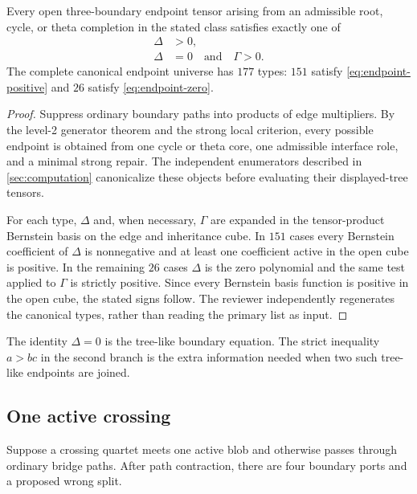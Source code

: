 \begin{lemma}\label{lem:endpoint-dichotomy}
Every open three-boundary endpoint tensor arising from an admissible root, cycle, or theta completion in the stated class satisfies exactly one of
\begin{align}
\Delta&>0,\label{eq:endpoint-positive}\\
\Delta&=0\quad\text{and}\quad \Gamma>0.\label{eq:endpoint-zero}
\end{align}
The complete canonical endpoint universe has $177$ types: $151$ satisfy \eqref{eq:endpoint-positive} and $26$ satisfy \eqref{eq:endpoint-zero}.
\end{lemma}

\begin{proof}
Suppress ordinary boundary paths into products of edge multipliers.  By the level-2 generator theorem and the strong local criterion, every possible endpoint is obtained from one cycle or theta core, one admissible interface role, and a minimal strong repair.  The independent enumerators described in \cref{sec:computation} canonicalize these objects before evaluating their displayed-tree tensors.

For each type, $\Delta$ and, when necessary, $\Gamma$ are expanded in the tensor-product Bernstein basis on the edge and inheritance cube.  In $151$ cases every Bernstein coefficient of $\Delta$ is nonnegative and at least one coefficient active in the open cube is positive.  In the remaining $26$ cases $\Delta$ is the zero polynomial and the same test applied to $\Gamma$ is strictly positive.  Since every Bernstein basis function is positive in the open cube, the stated signs follow.  The reviewer independently regenerates the canonical types, rather than reading the primary list as input.
\end{proof}

The identity $\Delta=0$ is the tree-like boundary equation.  The strict inequality $a>bc$ in the second branch is the extra information needed when two such tree-like endpoints are joined.

\subsection{One active crossing}

Suppose a crossing quartet meets one active blob and otherwise passes through ordinary bridge paths.  After path contraction, there are four boundary ports and a proposed wrong split.

